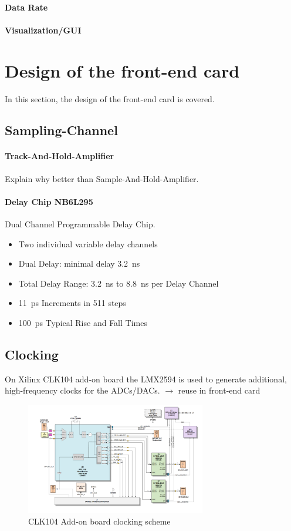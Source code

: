 \paragraph{Data Rate}
\paragraph{Visualization/GUI}
\newpage
\section{Design of the front-end card}
In this section, the design of the front-end card is covered.

\subsection{Sampling-Channel}
\paragraph{Track-And-Hold-Amplifier}
Explain why better than Sample-And-Hold-Amplifier.
\paragraph{Delay Chip NB6L295}
Dual Channel Programmable Delay Chip.

\begin{itemize}[noitemsep]
	\item Two individual variable delay channels
	\item Dual Delay: minimal delay \SI{3.2}{\nano \second}
	\item Total Delay Range: \SI{3.2}{\nano \second} to \SI{8.8}{\nano \second} per Delay Channel
	\item \SI{11}{\pico \second} Increments in 511 steps
	\item \SI{100}{\pico \second} Typical Rise and Fall Times
\end{itemize}

\subsection{Clocking}
On Xilinx CLK104 add-on board the LMX2594 is used to generate additional, high-frequency clocks for the ADCs/DACs. $\rightarrow$ reuse in front-end card
\begin{figure}[H]
	\centering
	\includegraphics[width = 0.7\textwidth]{chap/03-work/img/clk104}
	\caption{CLK104 Add-on board clocking scheme}
	\label{fig:clk104}
\end{figure}

